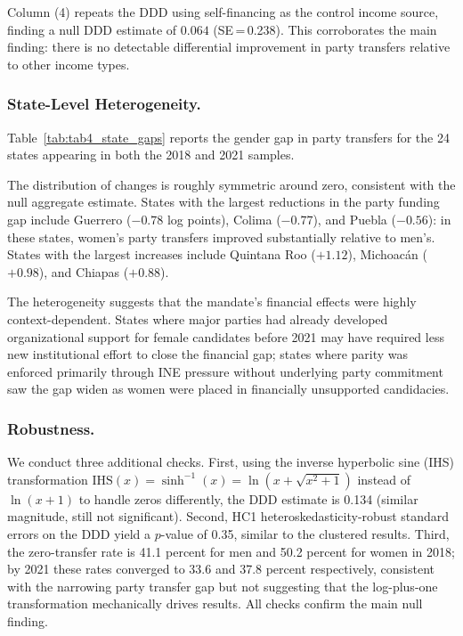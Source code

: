 \documentclass[12pt]{article}
\begin{document}
Column (4) repeats the DDD using self-financing as the control income source, finding a null DDD estimate of $0.064$ (SE\,=\,0.238). This corroborates the main finding: there is no detectable differential improvement in party transfers relative to other income types.

\subsubsection*{State-Level Heterogeneity.}
Table~\ref{tab:tab4_state_gaps} reports the gender gap in party transfers for the 24 states appearing in both the 2018 and 2021 samples.



The distribution of changes is roughly symmetric around zero, consistent with the null aggregate estimate. States with the largest reductions in the party funding gap include Guerrero ($-0.78$ log points), Colima ($-0.77$), and Puebla ($-0.56$): in these states, women's party transfers improved substantially relative to men's. States with the largest increases include Quintana Roo ($+1.12$), Michoac\'an ($+0.98$), and Chiapas ($+0.88$).

The heterogeneity suggests that the mandate's financial effects were highly context-dependent. States where major parties had already developed organizational support for female candidates before 2021 may have required less new institutional effort to close the financial gap; states where parity was enforced primarily through INE pressure without underlying party commitment saw the gap widen as women were placed in financially unsupported candidacies.

\subsubsection*{Robustness.}
We conduct three additional checks. First, using the inverse hyperbolic sine (IHS) transformation $\text{IHS}(x) = \sinh^{-1}(x) = \ln(x + \sqrt{x^2+1})$ instead of $\ln(x+1)$ to handle zeros differently, the DDD estimate is 0.134 (similar magnitude, still not significant). Second, HC1 heteroskedasticity-robust standard errors on the DDD yield a $p$-value of 0.35, similar to the clustered results. Third, the zero-transfer rate is 41.1 percent for men and 50.2 percent for women in 2018; by 2021 these rates converged to 33.6 and 37.8 percent respectively, consistent with the narrowing party transfer gap but not suggesting that the log-plus-one transformation mechanically drives results. All checks confirm the main null finding.
\end{document}
